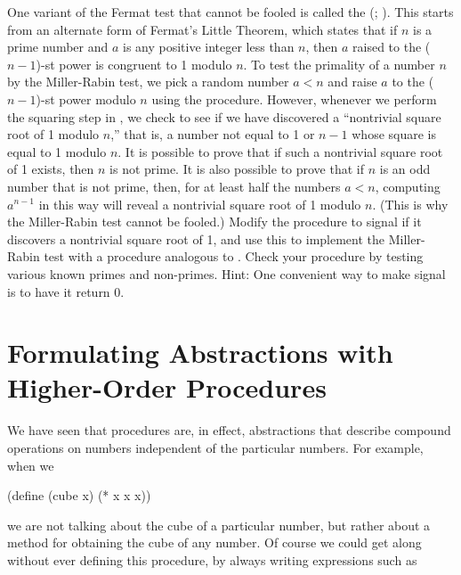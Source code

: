 \begin{exerciseGroup}
\label{Exercise 1.28}
 One variant of the Fermat test
that cannot be fooled is called the  (;
).  This starts from an alternate form of Fermat's Little Theorem,
which states that if \( n \) is a prime number and \( a \) is any positive integer
less than \( n \), then \( a \) raised to the (\( n-1 \))-st power is congruent to 1
modulo \( n \).  To test the primality of a number \( n \) by the Miller-Rabin
test, we pick a random number \( a < n \) and raise \( a \) to the (\( n-1 \))-st
power modulo \( n \) using the  procedure.  However, whenever we
perform the squaring step in , we check to see if we have
discovered a ``nontrivial square root of 1 modulo \( n \),'' that is, a number
not equal to 1 or \( n-1 \) whose square is equal to 1 modulo \( n \).  It is
possible to prove that if such a nontrivial square root of 1 exists, then \( n \)
is not prime.  It is also possible to prove that if \( n \) is an odd number that
is not prime, then, for at least half the numbers \( a < n \), computing
\( a^{n-1} \) in this way will reveal a nontrivial square root of 1 modulo
\( n \).  (This is why the Miller-Rabin test cannot be fooled.)  Modify the
 procedure to signal if it discovers a nontrivial square root of
1, and use this to implement the Miller-Rabin test with a procedure analogous
to .  Check your procedure by testing various known primes
and non-primes.  Hint: One convenient way to make  signal is to
have it return 0.
\end{exerciseGroup}

\section{Formulating Abstractions with Higher-Order Procedures}
\label{Section 1.3}

We have seen that procedures are, in effect, abstractions that describe
compound operations on numbers independent of the particular numbers.  For
example, when we

\begin{codeBlock}
(define (cube x) (* x x x))
\end{codeBlock}

\noindent
we are not talking about the cube of a particular number, but rather about a
method for obtaining the cube of any number.  Of course we could get along
without ever defining this procedure, by always writing expressions such as

